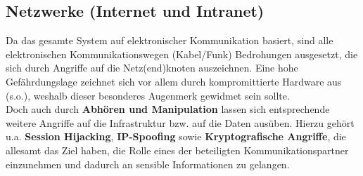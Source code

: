 \subsection{Netzwerke (Internet und Intranet)}
Da das gesamte System auf elektronischer Kommunikation basiert, sind alle elektronischen Kommunikationswegen (Kabel/Funk) Bedrohungen ausgesetzt, die sich durch Angriffe auf die Netz(end)knoten auszeichnen. Eine hohe Gefährdungslage zeichnet sich vor allem durch kompromittierte Hardware aus (s.o.), weshalb dieser besonderes Augenmerk gewidmet sein sollte.\\
Doch auch durch \textbf{Abhören und Manipulation} lassen sich entsprechende weitere Angriffe auf die Infrastruktur bzw. auf die Daten ausüben. Hierzu gehört u.a. \textbf{Session Hijacking}, \textbf{IP-Spoofing} sowie \textbf{Kryptografische Angriffe}, die allesamt das Ziel haben, die Rolle eines der beteiligten Kommunikationspartner einzunehmen und dadurch an sensible Informationen zu gelangen.